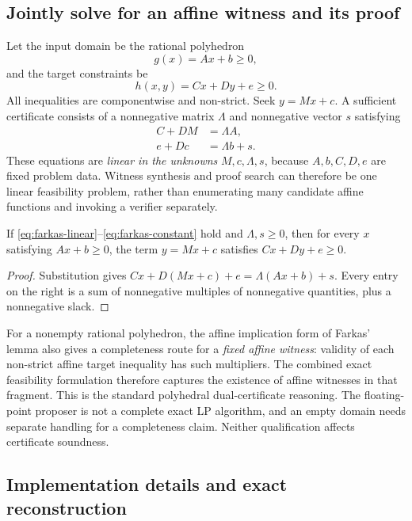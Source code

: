 \subsection{Jointly solve for an affine witness and its proof}

Let the input domain be the rational polyhedron
\[
g(x)=Ax+b\ge0,
\]
and the target constraints be
\[
h(x,y)=Cx+Dy+e\ge0.
\]
All inequalities are componentwise and non-strict. Seek $y=Mx+c$. A sufficient
certificate consists of a nonnegative matrix $\Lambda$ and nonnegative vector
$s$ satisfying
\begin{align}
C+DM&=\Lambda A,\label{eq:farkas-linear}\\
e+Dc&=\Lambda b+s.\label{eq:farkas-constant}
\end{align}
These equations are \emph{linear in the unknowns} $M,c,\Lambda,s$, because
$A,b,C,D,e$ are fixed problem data. Witness synthesis and proof search can
therefore be one linear feasibility problem, rather than enumerating many
candidate affine functions and invoking a verifier separately.

\begin{proposition}
If \eqref{eq:farkas-linear}--\eqref{eq:farkas-constant} hold and
$\Lambda,s\ge0$, then for every $x$ satisfying $Ax+b\ge0$, the term
$y=Mx+c$ satisfies $Cx+Dy+e\ge0$.
\end{proposition}
\begin{proof}
Substitution gives
$Cx+D(Mx+c)+e=\Lambda(Ax+b)+s$.
Every entry on the right is a sum of nonnegative multiples of nonnegative
quantities, plus a nonnegative slack.
\end{proof}

For a nonempty rational polyhedron, the affine implication form of Farkas'
lemma also gives a completeness route for a \emph{fixed affine witness}:
validity of each non-strict affine target inequality has such multipliers.
The combined exact feasibility formulation therefore captures the existence
of affine witnesses in that fragment. This is the standard polyhedral dual-certificate reasoning.\cite{mosek}
The floating-point proposer is not a complete exact LP algorithm, and an empty domain needs separate handling
for a completeness claim. Neither qualification affects certificate soundness.

\subsection{Implementation details and exact reconstruction}

